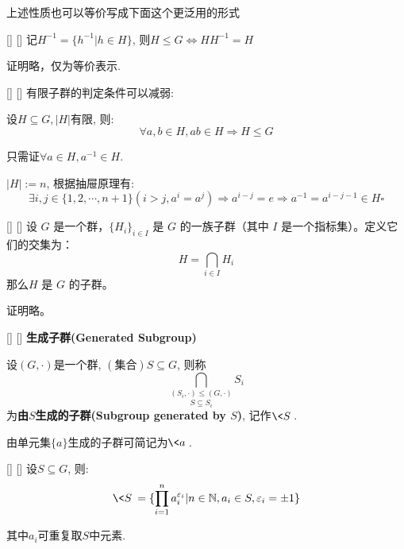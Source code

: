 \documentclass[UTF8]{ctexart}
\begin{document}
        上述性质也可以等价写成下面这个更泛用的形式
        \begin{ppt}
            []
            {}
            []
            []
        记$H^{-1}=\{h^{-1}|h\in H\}$, 则$H\leq G \iff HH^{-1}=H$ 
       \end{ppt}

        \begin{prf}
            证明略，仅为等价表示.
        \end{prf}
  
		\begin{ppt}
            []
            {}
            []
            []
			有限子群的判定条件可以减弱: 
			
			设$H\subseteq G, |H|$有限, 则: 
			\[\forall a,b\in H, ab\in H\Longrightarrow H\leq G\]
		\end{ppt}
  
	\begin{prf}
			只需证$\forall a\in H, a^{-1}\in H$. 
			
			$|H|:=n$, 根据抽屉原理有: 
			\[\exists i,j\in\{1,2,\cdots,n+1\}(i>j,a^{i}=a^{j})\Longrightarrow a^{i-j}=e\Longrightarrow a^{-1}=a^{i-j-1}\in H\square\]
	\end{prf}

        \begin{ppt}
            []
            {}
            []
            []
            设 \( G \) 是一个群，\( \{H_i\}_{i \in I} \) 是 \( G \) 的一族子群（其中 \( I \) 是一个指标集）。定义它们的交集为：
            \[
            H = \bigcap_{i \in I} H_i
            \]
            那么\( H \) 是 \( G \) 的子群。
       \end{ppt}

        \begin{prf}
            证明略。
        \end{prf}
  
		\begin{dfn}
            []
            {}
            []
            []
			\textbf{生成子群(Generated Subgroup)}

			设$(G,\cdot)$是一个群, $(\text{集合})S\subseteq G$, 则称
			\[\underset{S\subseteq S_{i}}{\bigcap_{(S_{i},\cdot)\leq (G,\cdot)}}S_{i}\]
			为\textbf{由$S$生成的子群(Subgroup generated by $S$)}, 记作$\<S\>$. 

			由单元集$\{a\}$生成的子群可简记为$\<a\>$. 
		\end{dfn}
		
		\begin{ppt}
            []
            {}
            []
            []
			设$S\subseteq G$, 则: 
			\[\<S\>=\{\prod_{i=1}^{n}a_{i}^{\varepsilon_{i}}|n\in\mathbb{N},a_{i}\in S,\varepsilon_{i}=\pm 1\}\]
			
			其中$a_{i}$可重复取$S$中元素. 
		\end{ppt}
  
\end{document}
